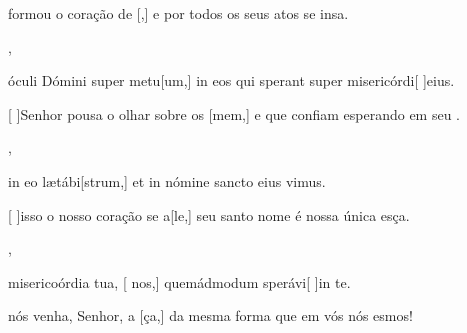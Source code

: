 {    {\item {} formou o coração de [,] e por todos os seus atos se insa.~\Antiphona},
  {\item {} óculi Dómini super metu[um,] in eos qui sperant super misericórdi[ ]{e}ius.~\Antiphona}%
    {\item {}[ ]{Se}nhor pousa o olhar sobre os [mem,] e que confiam esperando em seu .~\Antiphona},
  {\item {} in eo lætábi[strum,] et in nómine sancto eius vimus.~\Antiphona}%
    {\item {}[ ]{is}so o nosso coração se a[le,] seu santo nome é nossa única esça.~\Antiphona},
  {\item {} misericoórdia tua, [ nos,] quemádmodum sperávi[ ]{in} te.~\Antiphona}%
    {\item {} nós venha, Senhor, a [ça,] da mes\-ma forma que em vós nós esmos!~\Antiphona}
}